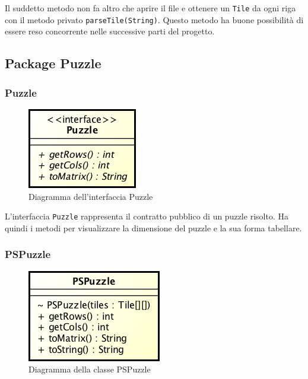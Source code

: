 \documentclass[a4paper, 12pt]{article}
\begin{document}
        Il suddetto metodo non fa altro che aprire il file e ottenere un \verb|Tile| da ogni riga con il metodo privato \verb|parseTile(String)|. Questo metodo ha buone possibilità di essere reso concorrente nelle successive parti del progetto.

    \subsection{Package Puzzle}

      \subsubsection{Puzzle}

        \begin{figure}[H]

          \centering
          \includegraphics[scale=0.7]{uml/puzzle.png}
          \caption{Diagramma dell'interfaccia Puzzle}
          \label{uml:puzzle}

        \end{figure}

        L'interfaccia \verb|Puzzle| rappresenta il contratto pubblico di un puzzle risolto. Ha quindi i metodi per visualizzare la dimensione del puzzle e la sua forma tabellare.

      \subsubsection{PSPuzzle}

        \begin{figure}[H]

          \centering
          \includegraphics[scale=0.7]{uml/pspuzzle.png}
          \caption{Diagramma della classe PSPuzzle}
          \label{uml:pspuzzle}

        \end{figure}
\end{document}
